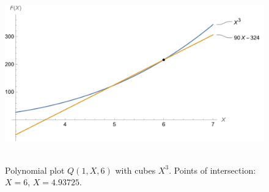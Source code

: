 ﻿\begin{figure}[H]
    \centering
    \includegraphics[width=1\textwidth]{sections/images/02_plots_polynomial_q1_n6_with_cubes}
    ~\caption{Polynomial plot $Q(1, X, 6)$ with cubes $X^3$.
    Points of intersection: $X=6$, $X=4.93725$.}\label{fig:figure8}
\end{figure}
